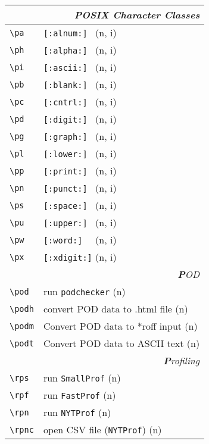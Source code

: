 \documentclass[oneside,10pt,landscape,DIV17]{scrartcl}
\begin{document}
\begin{multicols}{3}
\begin{center}
\begin{tabular}[]{|p{11mm}|p{58mm}|}
\hline
\multicolumn{2}{|r|}{\textsl{\textbf{P}OSIX Character Classes}}\\[1.0ex]
\hline \verb'\pa' &  \verb'[:alnum:] '         \hfill (n, i)   \\
\hline \verb'\ph' &  \verb'[:alpha:] '         \hfill (n, i)   \\
\hline \verb'\pi' &  \verb'[:ascii:] '         \hfill (n, i)   \\
\hline \verb'\pb' &  \verb'[:blank:] '         \hfill (n, i)   \\
\hline \verb'\pc' &  \verb'[:cntrl:] '         \hfill (n, i)   \\
\hline \verb'\pd' &  \verb'[:digit:] '         \hfill (n, i)   \\
\hline \verb'\pg' &  \verb'[:graph:] '         \hfill (n, i)   \\
\hline \verb'\pl' &  \verb'[:lower:] '         \hfill (n, i)   \\
\hline \verb'\pp' &  \verb'[:print:] '         \hfill (n, i)   \\
\hline \verb'\pn' &  \verb'[:punct:] '         \hfill (n, i)   \\
\hline \verb'\ps' &  \verb'[:space:] '         \hfill (n, i)   \\
\hline \verb'\pu' &  \verb'[:upper:] '         \hfill (n, i)   \\
\hline \verb'\pw' &  \verb'[:word:]  '         \hfill (n, i)   \\
\hline \verb'\px' &  \verb'[:xdigit:]'         \hfill (n, i)   \\
\hline
\hline
\multicolumn{2}{|r|}{\textsl{\textbf{P}OD}}                       \\[1.0ex]
\hline \verb'\pod'    & run \verb'podchecker'           \hfill (n)\\
\hline \verb'\podh'   & convert POD data to .html file  \hfill (n)\\
\hline \verb'\podm'   & Convert POD data to *roff input \hfill (n)\\
\hline \verb'\podt'   & Convert POD data to ASCII text  \hfill (n)\\
\hline
\hline
\multicolumn{2}{|r|}{\textsl{\textbf{P}rofiling}}                 \\[1.0ex]
\hline \verb'\rps'    & run \verb'SmallProf'            \hfill (n)\\
\hline \verb'\rpf'    & run \verb'FastProf'             \hfill (n)\\
\hline \verb'\rpn'    & run \verb'NYTProf'              \hfill (n)\\
\hline \verb'\rpnc'   & open CSV file (\verb'NYTProf')  \hfill (n)\\
\hline
\end{tabular}%
%
\end{center}%
\end{multicols}%
\end{document}
